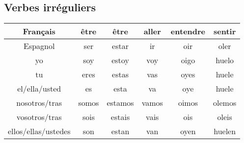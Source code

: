 \subsection{Verbes irréguliers}
\begin{table}[hbt!]
    \centering
    \setlength\tabcolsep{17.5pt}
    \begin{tabular}{|c||c|c|c|c|c|}
         \hline
         Français               & \textcolor{BrickRed}{être} & \textcolor{BrickRed}{être} & \textcolor{BrickRed}{aller} & \textcolor{BrickRed}{entendre} & \textcolor{BrickRed}{sentir} \\
         \hline
         Espagnol               & \textcolor{electricultramarine}{ser} & \textcolor{electricultramarine}{estar} & \textcolor{electricultramarine}{ir} & \textcolor{electricultramarine}{oir} & \textcolor{electricultramarine}{oler}\\
         \hline
         \hline
         yo                     & soy            & estoy           & voy        & oigo      & huelo \\    
         \hline
         tu                     & eres           & estas           & vas        & oyes      & huele \\
         \hline
         el/ella/usted          & es             & esta            & va         & oye       & huele \\
        \hline
        nosotros/tras           & somos          & estamos         & vamos      & oimos     & olemos \\
        \hline
        vosotros/tras           & sois           & estais          & vais       & ois       & oleis \\
        \hline
        ellos/ellas/ustedes     & son            & estan           & van        & oyen      & huelen \\
        \hline
    \end{tabular}
    \label{tab:label2}
\end{table}
